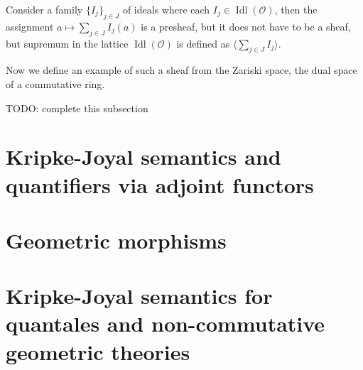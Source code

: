 \documentclass[a4paper]{article}
\theoremstyle{defin}
\theoremstyle{theorem}
\theoremstyle{claim}
\theoremstyle{prop}
\theoremstyle{lemma}
\theoremstyle{fact}
\theoremstyle{ex}
\theoremstyle{col}
\begin{document}
Consider a family $\{ I_j \}_{j \in J}$ of ideals where each $I_j \in \operatorname{Idl}(\mathcal{O})$, then the assignment $a \mapsto \sum \limits_{j \in J} I_j(a)$ is a presheaf, but it does not have to be a sheaf, but supremum in the lattice $\operatorname{Idl}(\mathcal{O})$ is defined as $\langle \sum \limits_{j \in J} I_j \rangle$.

Now we define an example of such a sheaf from the Zariski space, the dual space of a commutative ring.

TODO: complete this subsection

\section{Kripke-Joyal semantics and quantifiers via adjoint functors}

\section{Geometric morphisms}

\section{Kripke-Joyal semantics for quantales and non-commutative geometric theories}



\end{document}
